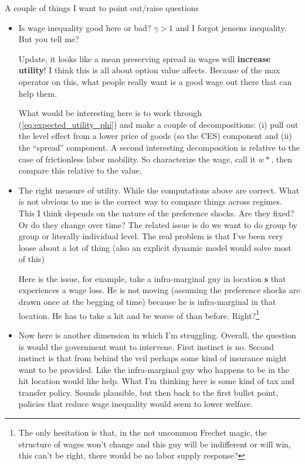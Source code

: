 \documentclass[pdftex,12pt]{article}
\begin{document}
A couple of things I want to point out/raise questions
\begin{itemize}
\item Is wage inequality good here or bad? $\gamma > 1$ and I forgot jensens inequality. But you tell me?

    Update, it looks like a mean preserving spread in wages will \textbf{increase utility}! I think this is all about option value affects. Because of the max operator on this, what people really want is a good wage out there that can help them.

    What would be interesting here is to work through (\ref{eq:expected_utility_phi}) and make a couple of decompositions: (i) pull out the level effect from a lower price of goods (so the CES) component and (ii) the ``spread'' component. A second interesting decomposition is relative to the case of frictionless labor mobility. So characterize the wage, call it $w*$, then compare this relative to the value.

\item The right measure of utility. While the computations above are correct. What is not obvious to me is the correct way to compare things across regimes. This I think depends on the nature of the preference shocks. Are they fixed? Or do they change over time? The related issue is do we want to do group by group or literally individual level. The real problem is that I've been very loose about a lot of thing (also an explicit dynamic model would solve most of this)

    Here is the issue, for example, take a infra-marginal guy in location $\textbf{s}$ that experiences a wage loss. He is not moving (assuming the preference shocks are drawn once at the begging of time) because he is infra-marginal in that location. He has to take a hit and be worse of than before. Right?\footnote{The only hesitation is that, in the not uncommon Frechet magic, the structure of wages won't change and this guy will be indifferent or will win, this can't be right, there would be no labor supply response?}

\item Now here is another dimension in which I'm struggling. Overall, the question is would the government want to intervene. First instinct is no. Second instinct is that from behind the veil perhaps some kind of insurance might want to be provided. Like the infra-marginal guy who happens to be in the hit location would like help. What I'm thinking here is some kind of tax and transfer policy. Sounds plausible, but then back to the first bullet point, policies that reduce wage inequality would seem to lower welfare.

\end{itemize}
\end{document}
